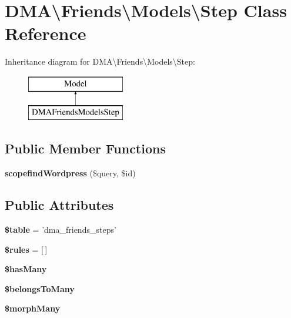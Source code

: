 \hypertarget{classDMA_1_1Friends_1_1Models_1_1Step}{\section{D\+M\+A\textbackslash{}Friends\textbackslash{}Models\textbackslash{}Step Class Reference}
\label{classDMA_1_1Friends_1_1Models_1_1Step}
}
Inheritance diagram for D\+M\+A\textbackslash{}Friends\textbackslash{}Models\textbackslash{}Step\+:\begin{figure}[H]
\begin{center}
\leavevmode
\includegraphics[height=2.000000cm]{d9/d03/classDMA_1_1Friends_1_1Models_1_1Step}
\end{center}
\end{figure}
\subsection*{Public Member Functions}
\begin{DoxyCompactItemize}
\item 
\hypertarget{classDMA_1_1Friends_1_1Models_1_1Step_a58a71b1c9b39249ac24484bbd2307db2}{{\bfseries scopefind\+Wordpress} (\$query, \$id)}\label{classDMA_1_1Friends_1_1Models_1_1Step_a58a71b1c9b39249ac24484bbd2307db2}

\end{DoxyCompactItemize}
\subsection*{Public Attributes}
\begin{DoxyCompactItemize}
\item 
\hypertarget{classDMA_1_1Friends_1_1Models_1_1Step_a73a0d48cb46b1aeeaad83499e8449acc}{{\bfseries \$table} = 'dma\+\_\+friends\+\_\+steps'}\label{classDMA_1_1Friends_1_1Models_1_1Step_a73a0d48cb46b1aeeaad83499e8449acc}

\item 
\hypertarget{classDMA_1_1Friends_1_1Models_1_1Step_a13476d5ca718080b85c9633270bf4942}{{\bfseries \$rules} = \mbox{[}$\,$\mbox{]}}\label{classDMA_1_1Friends_1_1Models_1_1Step_a13476d5ca718080b85c9633270bf4942}

\item 
{\bfseries \$has\+Many}
\item 
{\bfseries \$belongs\+To\+Many}
\item 
{\bfseries \$morph\+Many}
\end{DoxyCompactItemize}
